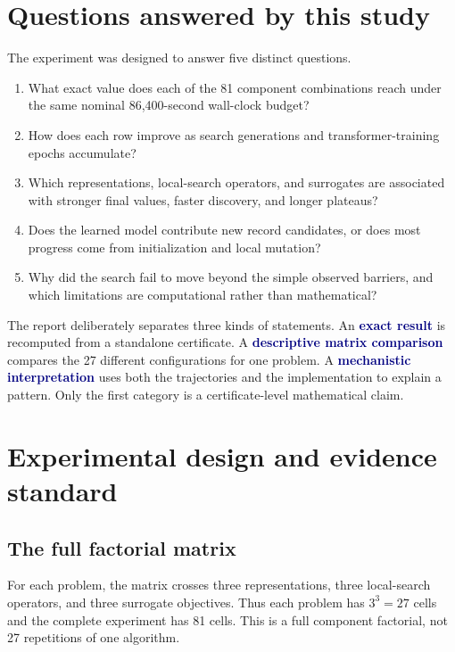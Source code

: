 \documentclass[11pt]{article}
\newcommand{\important}[1]{\textcolor{navy}{\textbf{#1}}}
\begin{document}
\tableofcontents
\clearpage

\section{Questions answered by this study}

The experiment was designed to answer five distinct questions.

\begin{enumerate}
\item What exact value does each of the 81 component combinations reach under
the same nominal 86,400-second wall-clock budget?
\item How does each row improve as search generations and transformer-training
epochs accumulate?
\item Which representations, local-search operators, and surrogates are
associated with stronger final values, faster discovery, and longer plateaus?
\item Does the learned model contribute new record candidates, or does most
progress come from initialization and local mutation?
\item Why did the search fail to move beyond the simple observed barriers, and
which limitations are computational rather than mathematical?
\end{enumerate}

The report deliberately separates three kinds of statements.  An
\important{exact result} is recomputed from a standalone certificate.  A
\important{descriptive matrix comparison} compares the 27 different
configurations for one problem.  A \important{mechanistic interpretation}
uses both the trajectories and the implementation to explain a pattern.  Only
the first category is a certificate-level mathematical claim.

\section{Experimental design and evidence standard}

\subsection{The full factorial matrix}

For each problem, the matrix crosses three representations, three local-search
operators, and three surrogate objectives.  Thus each problem has
$3^3=27$ cells and the complete experiment has 81 cells.  This is a full
component factorial, not 27 repetitions of one algorithm.
\end{document}
